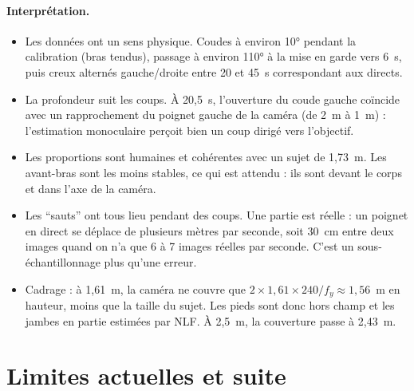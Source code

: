\documentclass[11pt,a4paper]{article}
\begin{document}
\paragraph{Interprétation.}
\begin{itemize}
  \item Les données ont un sens physique. Coudes à environ 10° pendant la calibration (bras tendus), passage à environ 110° à la mise en garde vers 6~s, puis creux alternés gauche/droite entre 20 et 45~s correspondant aux directs.
  \item La profondeur suit les coups. À 20,5~s, l'ouverture du coude gauche coïncide avec un rapprochement du poignet gauche de la caméra (de 2~m à 1~m) : l'estimation monoculaire perçoit bien un coup dirigé vers l'objectif.
  \item Les proportions sont humaines et cohérentes avec un sujet de 1,73~m. Les avant-bras sont les moins stables, ce qui est attendu : ils sont devant le corps et dans l'axe de la caméra.
  \item Les \enquote{sauts} ont tous lieu pendant des coups. Une partie est réelle : un poignet en direct se déplace de plusieurs mètres par seconde, soit 30~cm entre deux images quand on n'a que 6 à 7 images réelles par seconde. C'est un sous-échantillonnage plus qu'une erreur.
  \item Cadrage : à 1,61~m, la caméra ne couvre que $2 \times 1{,}61 \times 240/f_y \approx 1{,}56$~m en hauteur, moins que la taille du sujet. Les pieds sont donc hors champ et les jambes en partie estimées par NLF. À 2,5~m, la couverture passe à 2,43~m.
\end{itemize}



\section{Limites actuelles et suite}
\end{document}
